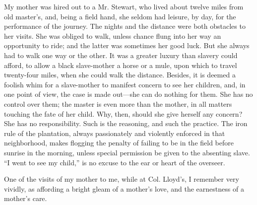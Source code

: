 My mother was hired out to a Mr. Stewart, who lived about twelve miles
from old master's, and, {\protect\hypertarget{54}{}{}}being a field
hand, she seldom had leisure, by day, for the performance of the
journey. The nights and the distance were both obstacles to her visits.
She was obliged to walk, unless chance flung into her way an opportunity
to ride; and the latter was sometimes her good luck. But she always had
to walk one way or the other. It was a greater luxury than slavery could
afford, to allow a black slave-mother a horse or a mule, upon which to
travel twenty-four miles, when she could walk the distance. Besides, it
is deemed a foolish whim for a slave-mother to manifest concern to see
her children, and, in one point of view, the case is made out---she can
do nothing for them. She has no control over them; the master is even
more than the mother, in all matters touching the fate of her child.
Why, then, should she give herself any concern? She has no
responsibility. Such is the reasoning, and such the practice. The iron
rule of the plantation, always passionately and violently enforced in
that neighborhood, makes flogging the penalty of failing to be in the
field before sunrise in the morning, unless special permission be given
to the absenting slave. ``I went to see my child,'' is no excuse to the
ear or heart of the overseer.

One of the visits of my mother to me, while at Col. Lloyd's, I remember
very vividly, as affording a bright gleam of a mother's love, and the
earnestness of a mother's care.

